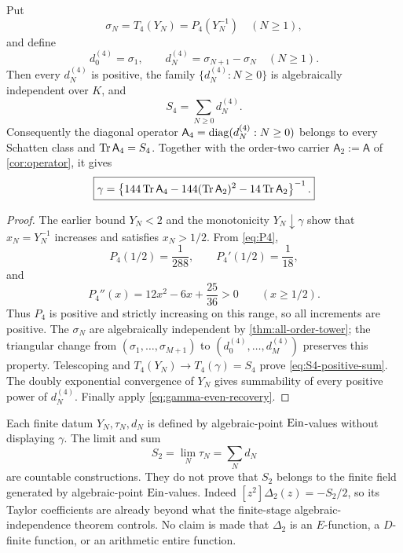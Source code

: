 \begin{theorem}
\label{thm:positive-S4-carrier}
Put
\[
 \sigma_N=T_4(Y_N)=P_4(Y_N^{-1})\quad(N\ge1),
\]
and define
\[
 d_0^{(4)}=\sigma_1,\qquad
 d_N^{(4)}=\sigma_{N+1}-\sigma_N\quad(N\ge1).
\]
Then every \(d_N^{(4)}\) is positive, the family
\(\{d_N^{(4)}:N\ge0\}\) is algebraically independent over \(K\), and
\begin{equation}\label{eq:S4-positive-sum}
 S_4=\sum_{N\ge0}d_N^{(4)}.
\end{equation}
Consequently the diagonal operator
\(\mathsf A_4=\operatorname{diag}(d_N^{(4)}:N\ge0)\) belongs to every Schatten class and
\(\operatorname{Tr}\mathsf A_4=S_4\).  Together with the order-two carrier
\(\mathsf A_2:=\mathsf A\) of \cref{cor:operator}, it gives
\begin{equation}\label{eq:gamma-two-positive-carriers}
 \boxed{\displaystyle
 \gamma=
 \left\{144\operatorname{Tr}\mathsf A_4
 -144(\operatorname{Tr}\mathsf A_2)^2-14\operatorname{Tr}\mathsf A_2\right\}^{-1}.}
\end{equation}
\end{theorem}

\begin{proof}
The earlier bound \(Y_N<2\) and the monotonicity \(Y_N\downarrow\gamma\)
show that \(x_N=Y_N^{-1}\) increases and satisfies \(x_N>1/2\).  From
\eqref{eq:P4},
\[
 P_4(1/2)=\frac1{288},\qquad P_4'(1/2)=\frac1{18},
\]
and
\[
 P_4''(x)=12x^2-6x+\frac{25}{36}>0\qquad(x\ge1/2).
\]
Thus \(P_4\) is positive and strictly increasing on this range, so all
increments are positive.  The \(\sigma_N\) are algebraically
independent by \cref{thm:all-order-tower}; the triangular change from
\((\sigma_1,\ldots,\sigma_{M+1})\) to
\((d_0^{(4)},\ldots,d_M^{(4)})\) preserves this property.  Telescoping and
\(T_4(Y_N)\to T_4(\gamma)=S_4\) prove
\eqref{eq:S4-positive-sum}.  The doubly exponential convergence of \(Y_N\)
gives summability of every positive power of \(d_N^{(4)}\).  Finally apply
\eqref{eq:gamma-even-recovery}.
\end{proof}

\begin{remark}
Each finite datum \(Y_N,\tau_N,d_N\) is defined by algebraic-point
\(\operatorname{Ein}\)-values without displaying \(\gamma\).  The limit and sum
\[
 S_2=\lim_N\tau_N=\sum_Nd_N
\]
are countable constructions.  They do not prove that \(S_2\) belongs to the
finite field generated by algebraic-point \(\operatorname{Ein}\)-values.  Indeed
\([z^2]\Delta_2(z)=-S_2/2\), so its Taylor coefficients are already beyond
what the finite-stage algebraic-independence theorem controls.  No claim is
made that \(\Delta_2\) is an \(E\)-function, a \(D\)-finite function, or an
arithmetic entire function.
\end{remark}

